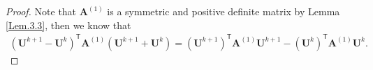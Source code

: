 \documentclass{siamart171218}
\numberwithin{theorem}{section}
\numberwithin{equation}{section}
\begin{document}
\begin{proof}
Note that $\mathbf{A}^{(1)}$ is a symmetric and positive definite
 matrix by Lemma \ref{Lem.3.3}, then we know that
  \begin{equation}\label{eq.3.21}
\begin{aligned}\displaystyle
\left(\mathbf{U}^{k+1}-\mathbf{U}^k\right)^{\mathsf{T}}\mathbf{A}^{(1)}
\left(\mathbf{U}^{k+1}+\mathbf{U}^k\right)
=\left(\mathbf{U}^{k+1}\right)^{\mathsf{T}}\mathbf{A}^{(1)}\mathbf{U}^{k+1}
-\left(\mathbf{U}^{k}\right)^{\mathsf{T}}\mathbf{A}^{(1)}\mathbf{U}^{k}.
\end{aligned}
\end{equation}
%


\end{proof}
\end{document}
